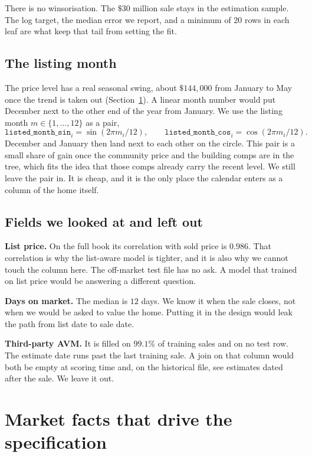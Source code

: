 \documentclass[11pt]{article}
\begin{document}
There is no winsorisation. The \(\$30\) million sale stays in the estimation sample. The log target, the median error we report, and a minimum of 20 rows in each leaf are what keep that tail from setting the fit.

\subsection{The listing month}

The price level has a real seasonal swing, about \(\$144{,}000\) from January to May once the trend is taken out (Section~\ref{sec:market}). A linear month number would put December next to the other end of the year from January. We use the listing month \(m \in \{1,\ldots,12\}\) as a pair,
\[
\texttt{listed\_month\_sin}_i = \sin(2\pi m_i/12), \qquad
\texttt{listed\_month\_cos}_i = \cos(2\pi m_i/12).
\]
December and January then land next to each other on the circle. This pair is a small share of gain once the community price and the building comps are in the tree, which fits the idea that those comps already carry the recent level. We still leave the pair in. It is cheap, and it is the only place the calendar enters as a column of the home itself.

\subsection{Fields we looked at and left out}
\label{sec:excluded}

\textbf{List price.} On the full book its correlation with sold price is \(0.986\). That correlation is why the list-aware model is tighter, and it is also why we cannot touch the column here. The off-market test file has no ask. A model that trained on list price would be answering a different question.

\textbf{Days on market.} The median is \(12\) days. We know it when the sale closes, not when we would be asked to value the home. Putting it in the design would leak the path from list date to sale date.

\textbf{Third-party AVM.} It is filled on \(99.1\%\) of training sales and on no test row. The estimate date runs past the last training sale. A join on that column would both be empty at scoring time and, on the historical file, see estimates dated after the sale. We leave it out.

\section{Market facts that drive the specification}
\label{sec:market}
\end{document}
